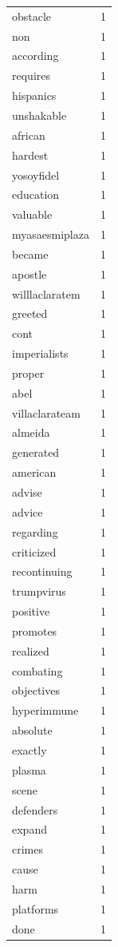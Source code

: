 \begin{tabular}{lr}
obstacle & 1 \\
non & 1 \\
according & 1 \\
requires & 1 \\
hispanics & 1 \\
unshakable & 1 \\
african & 1 \\
hardest & 1 \\
yosoyfidel & 1 \\
education & 1 \\
valuable & 1 \\
myasaesmiplaza & 1 \\
became & 1 \\
apostle & 1 \\
willlaclaratem & 1 \\
greeted & 1 \\
cont & 1 \\
imperialists & 1 \\
proper & 1 \\
abel & 1 \\
villaclarateam & 1 \\
almeida & 1 \\
generated & 1 \\
american & 1 \\
advise & 1 \\
advice & 1 \\
regarding & 1 \\
criticized & 1 \\
recontinuing & 1 \\
trumpvirus & 1 \\
positive & 1 \\
promotes & 1 \\
realized & 1 \\
combating & 1 \\
objectives & 1 \\
hyperimmune & 1 \\
absolute & 1 \\
exactly & 1 \\
plasma & 1 \\
scene & 1 \\
defenders & 1 \\
expand & 1 \\
crimes & 1 \\
cause & 1 \\
harm & 1 \\
platforms & 1 \\
done & 1 \\

\end{tabular}
